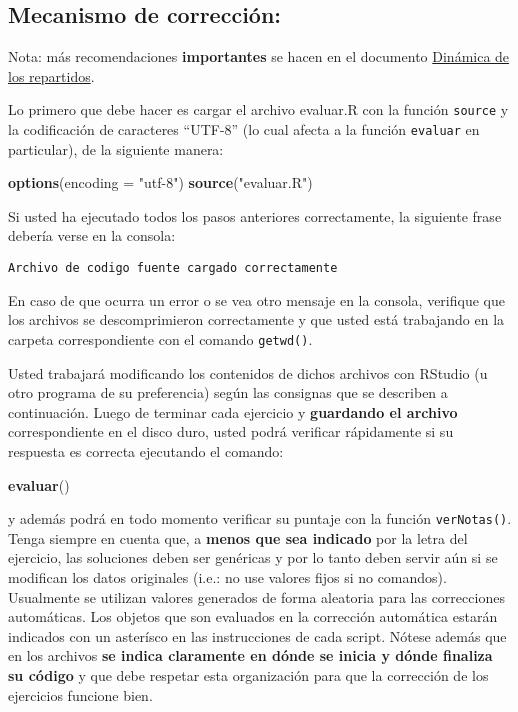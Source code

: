 \documentclass[]{article}
\newenvironment{Shaded}{}{}
\newcommand{\KeywordTok}[1]{\textcolor[rgb]{0.00,0.44,0.13}{\textbf{{#1}}}}
\newcommand{\DataTypeTok}[1]{\textcolor[rgb]{0.56,0.13,0.00}{{#1}}}
\newcommand{\StringTok}[1]{\textcolor[rgb]{0.25,0.44,0.63}{{#1}}}
\newcommand{\NormalTok}[1]{{#1}}
\begin{document}
\subsection{Mecanismo de corrección:}

Nota: más recomendaciones \textbf{importantes} se hacen en el documento
\href{http://goo.gl/P5Wnq}{Dinámica de los repartidos}.

Lo primero que debe hacer es cargar el archivo evaluar.R con la función
\texttt{source} y la codificación de caracteres ``UTF-8'' (lo cual
afecta a la función \texttt{evaluar} en particular), de la siguiente
manera:

\begin{Shaded}
\begin{Highlighting}[]
\KeywordTok{options}\NormalTok{(}\DataTypeTok{encoding =} \StringTok{"utf-8"}\NormalTok{)}
\KeywordTok{source}\NormalTok{(}\StringTok{"evaluar.R"}\NormalTok{)}
\end{Highlighting}
\end{Shaded}
Si usted ha ejecutado todos los pasos anteriores correctamente, la
siguiente frase debería verse en la consola:

\begin{verbatim}
Archivo de codigo fuente cargado correctamente
\end{verbatim}
En caso de que ocurra un error o se vea otro mensaje en la consola,
verifique que los archivos se descomprimieron correctamente y que usted
está trabajando en la carpeta correspondiente con el comando
\texttt{getwd()}.

Usted trabajará modificando los contenidos de dichos archivos con
RStudio (u otro programa de su preferencia) según las consignas que se
describen a continuación. Luego de terminar cada ejercicio y
\textbf{guardando el archivo} correspondiente en el disco duro, usted
podrá verificar rápidamente si su respuesta es correcta ejecutando el
comando:

\begin{Shaded}
\begin{Highlighting}[]
\KeywordTok{evaluar}\NormalTok{()}
\end{Highlighting}
\end{Shaded}
y además podrá en todo momento verificar su puntaje con la función
\texttt{verNotas()}. Tenga siempre en cuenta que, a \textbf{menos que
sea indicado} por la letra del ejercicio, las soluciones deben ser
genéricas y por lo tanto deben servir aún si se modifican los datos
originales (i.e.: no use valores fijos si no comandos). Usualmente se
utilizan valores generados de forma aleatoria para las correcciones
automáticas. Los objetos que son evaluados en la corrección automática
estarán indicados con un asterísco en las instrucciones de cada script.
Nótese además que en los archivos \textbf{se indica claramente en dónde
se inicia y dónde finaliza su código} y que debe respetar esta
organización para que la corrección de los ejercicios funcione bien.
\end{document}

